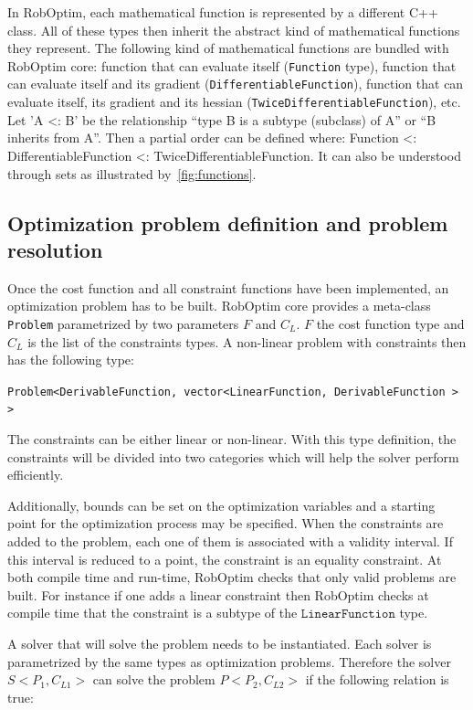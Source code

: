 \documentclass[conference,final,a4paper,twocolumn,9pt]{IEEEtran}
\begin{document}
In RobOptim, each mathematical function is represented by a different
C++ class. All of these types then inherit the abstract kind of
mathematical functions they represent. The following kind of
mathematical functions are bundled with RobOptim core: function that
can evaluate itself (\texttt{Function} type), function that can
evaluate itself and its gradient (\texttt{DifferentiableFunction}),
function that can evaluate itself, its gradient and its hessian
(\texttt{TwiceDifferentiableFunction}), etc.  Let 'A <: B' be the
relationship ``type B is a subtype (subclass) of A'' or ``B inherits
from A''. Then a partial order can be defined where: Function <:
DifferentiableFunction <: TwiceDifferentiableFunction. It can also be
understood through sets as illustrated by~\autoref{fig:functions}.


\subsection{Optimization problem definition and problem resolution}


Once the cost function and all constraint functions have been
implemented, an optimization problem has to be built. RobOptim core
provides a meta-class \texttt{Problem} parametrized by two parameters
$F$ and $C_L$. $F$ the cost function type and $C_L$ is the list of the
constraints types. A non-linear problem with constraints then has the
following type:


\texttt{Problem<DerivableFunction, vector<LinearFunction, DerivableFunction > >}


The constraints can be either linear or non-linear. With this type
definition, the constraints will be divided into two categories which
will help the solver perform efficiently.

Additionally, bounds can be set on the optimization variables and a
starting point for the optimization process may be specified. When the
constraints are added to the problem, each one of them is associated
with a validity interval. If this interval is reduced to a point, the
constraint is an equality constraint. At both compile time and
run-time, RobOptim checks that only valid problems are built. For
instance if one adds a linear constraint then RobOptim checks at
compile time that the constraint is a subtype of the
$\texttt{LinearFunction}$ type.


A solver that will solve the problem needs to be instantiated. Each
solver is parametrized by the same types as optimization
problems. Therefore the solver $S<P_1,C_{L1}>$ can solve the problem
$P<P_2,C_{L2}>$ if the following relation is true:
\end{document}
